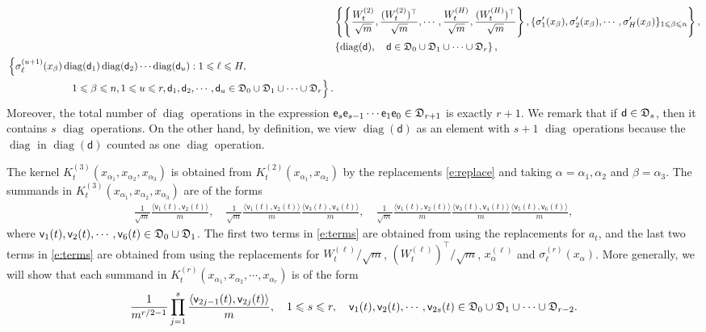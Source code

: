 \documentclass{article}
\numberwithin{equation}{section}
\newcommand{\fD}{{\frak D}}
\newcommand{\sfe}{{\mathsf e}}
\newcommand{\sfd}{{\mathsf d}}
\newcommand{\sfv}{{\mathsf v}}
\newcommand{\al}{\alpha}
\DeclareMathOperator{\diag}{diag}
\renewcommand{\leq}{\leqslant}
\newcommand{\1}{\mathds{1}}
\theoremstyle{plain} %
\begin{document}
\begin{align*}\begin{split}
& \left\{\left\{\frac{W_t^{(2)}}{\sqrt m},\frac{(W_t^{(2)})^\top}{\sqrt m},\cdots, \frac{W_t^{(H)}}{\sqrt m},\frac{(W_t^{(H)})^\top}{\sqrt m}\right\} , \{\sigma_1'(x_\beta), \sigma_2'(x_\beta), \cdots, \sigma_H'(x_\beta)\}_{1\leq \beta\leq n}\right\},\\
&\left\{\diag(\sfd),\quad \sfd\in \fD_0\cup\fD_1\cup\cdots\cup \fD_r\right\},\\
\begin{split}
&\left\{\sigma_\ell^{(u+1)}(x_\beta)\diag(\sfd_1)\diag(\sfd_2)\cdots \diag(\sfd_u): 1\leq \ell\leq H, \right. \\
&\left.\phantom{\sfe_j\in \left\{\sigma_\ell^{(u+1)}\right\}}1\leq \beta\leq n, 1\leq u\leq r, \sfd_1,\sfd_2,\cdots,\sfd_u\in \fD_0\cup \fD_1\cup\cdots\cup \fD_r\right\}.
\end{split}
\end{split}\end{align*}
Moreover, 
the total number of $\diag$ operations in the expression $\sfe_s\sfe_{s-1}\cdots \sfe_1\sfe_0\in\fD_{r+1}$   is exactly $r+1$.  We remark that if $\sfd\in \fD_s$, then it contains $s$ $\diag$ operations.  On the other hand, by definition, we view   $\diag(\sfd)$ as an element with  $s+1$ $\diag$ operations because the $\diag$ in $\diag(\sfd)$ counted as one $\diag$ operation. 
 

The kernel $K_t^{(3)}(x_{\al_1}, x_{\al_2},  x_{\al_3})$ is obtained from $K_t^{(2)}(x_{\al_1},x_{\al_2})$ by the replacements \eqref{e:replace} and taking $\al=\al_1,\al_2$ and $\beta=\al_3$. The summands in $K_t^{(3)}(x_{\al_1}, x_{\al_2}, x_{\al_3})$ are of the forms
\begin{align}\label{e:terms}
\frac{1}{\sqrt m}\frac{\langle \sfv_1(t),\sfv_2(t)\rangle}{m},\quad 
\frac{1}{\sqrt m}\frac{\langle \sfv_1(t),\sfv_2(t)\rangle}{m}\frac{\langle \sfv_3(t),\sfv_4(t)\rangle}{m},\quad \frac{1}{\sqrt m}\frac{\langle \sfv_1(t),\sfv_2(t)\rangle}{m}\frac{\langle \sfv_3(t),\sfv_4(t)\rangle}{m}\frac{\langle \sfv_5(t),\sfv_6(t)\rangle}{m},
\end{align}
where $\sfv_1(t),\sfv_2(t),\cdots,\sfv_6(t)\in \fD_0\cup \fD_1$.
The first two terms in \eqref{e:terms} are obtained from using the replacements for $a_t$, and the last two  terms in \eqref{e:terms} are obtained from using the replacements for $W_t^{(\ell)}/\sqrt m$, $(W_t^{(\ell)})^\top/\sqrt m$, $x_\al^{(\ell)}$ and $\sigma_\ell^{(r)}(x_\al)$. 
More generally, we will show that each summand in $K_t^{(r)}(x_{\al_1}, x_{\al_2},\cdots, x_{\al_r})$ is of the form
\begin{align}\label{e:form}
\frac{1}{m^{r/2-1}}\prod_{j=1}^s \frac{\langle \sfv_{2j-1}(t),\sfv_{2j}(t)\rangle}{m}, \quad 1\leq s\leq r,\quad \sfv_1(t), \sfv_2(t),\cdots, \sfv_{2s}(t)\in \fD_0\cup \fD_1\cup \cdots \cup \fD_{r-2}.
\end{align}
\end{document}
